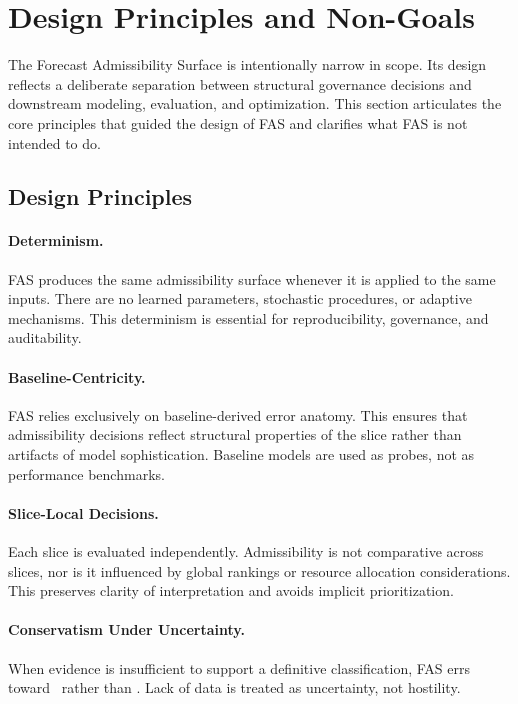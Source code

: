
\section{Design Principles and Non-Goals}
\label{sec:fas_design_nongoals}

The Forecast Admissibility Surface is intentionally narrow in scope. Its design
reflects a deliberate separation between structural governance decisions and
downstream modeling, evaluation, and optimization. This section articulates the
core principles that guided the design of FAS and clarifies what FAS is not
intended to do.

\subsection{Design Principles}

\paragraph{Determinism.}
FAS produces the same admissibility surface whenever it is applied to the same
inputs. There are no learned parameters, stochastic procedures, or adaptive
mechanisms. This determinism is essential for reproducibility, governance, and
auditability.

\paragraph{Baseline-Centricity.}
FAS relies exclusively on baseline-derived error anatomy. This ensures that
admissibility decisions reflect structural properties of the slice rather than
artifacts of model sophistication. Baseline models are used as probes, not as
performance benchmarks.

\paragraph{Slice-Local Decisions.}
Each slice is evaluated independently. Admissibility is not comparative across
slices, nor is it influenced by global rankings or resource allocation
considerations. This preserves clarity of interpretation and avoids implicit
prioritization.

\paragraph{Conservatism Under Uncertainty.}
When evidence is insufficient to support a definitive classification, FAS errs
toward \Conditional\ rather than \Blocked. Lack of data is treated as uncertainty,
not hostility.

